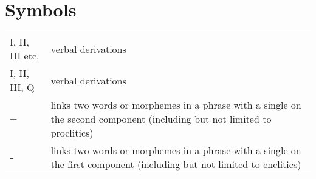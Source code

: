 \documentclass[output=paper]{langsci/langscibook}
\begin{document}
\section*{Symbols}

\begin{tabularx}{1\textwidth}{@{}lQ@{}}
I, II, III etc. &  verbal derivations\\
I, II, III, Q &  verbal derivations\\
= & links two words or morphemes in a phrase with a single  on the second component (including but not limited to proclitics)\\
꞊ & links two words or morphemes in a phrase with a single  on the first component (including but not limited to enclitics)
\end{tabularx}%

{\sloppy\printbibliography[heading=subbibliography,notkeyword=this]}
\end{document}
